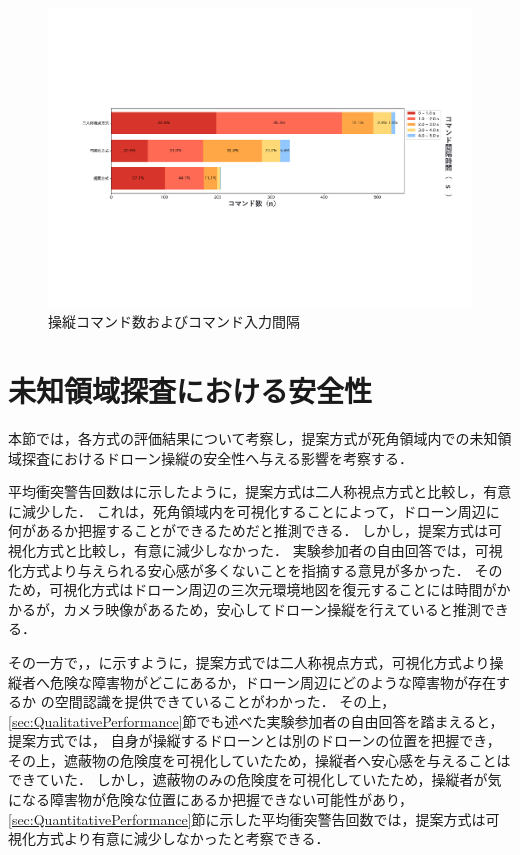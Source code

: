 \documentclass[a4paper,11pt]{ujreport}
\begin{document}
\begin{figure}[!tb]
  \centering
  \includegraphics[width=\linewidth]{img/06_safety.pdf}
  \caption{操縦コマンド数およびコマンド入力間隔}
  \label{fig:06_safety}
\end{figure}

\section{未知領域探査における安全性}
\label{sec:Safety}

本節では，各方式の評価結果について考察し，提案方式が死角領域内での未知領域探査におけるドローン操縦の安全性へ与える影響を考察する．
\par
平均衝突警告回数はに示したように，提案方式は二人称視点方式と比較し，有意に減少した．
これは，死角領域内を可視化することによって，ドローン周辺に何があるか把握することができるためだと推測できる．
しかし，提案方式は可視化方式と比較し，有意に減少しなかった．
実験参加者の自由回答では，可視化方式より与えられる安心感が多くないことを指摘する意見が多かった．
そのため，可視化方式はドローン周辺の三次元環境地図を復元することには時間がかかるが，カメラ映像があるため，安心してドローン操縦を行えていると推測できる．

その一方で，，に示すように，提案方式では二人称視点方式，可視化方式より操縦者へ危険な障害物がどこにあるか，ドローン周辺にどのような障害物が存在するか
の空間認識を提供できていることがわかった．
その上，\ref{sec:QualitativePerformance}節でも述べた実験参加者の自由回答を踏まえると，提案方式では，
自身が操縦するドローンとは別のドローンの位置を把握でき，その上，遮蔽物の危険度を可視化していたため，操縦者へ安心感を与えることはできていた．
しかし，遮蔽物のみの危険度を可視化していたため，操縦者が気になる障害物が危険な位置にあるか把握できない可能性があり，
\ref{sec:QuantitativePerformance}節に示した平均衝突警告回数では，提案方式は可視化方式より有意に減少しなかったと考察できる．
\end{document}
